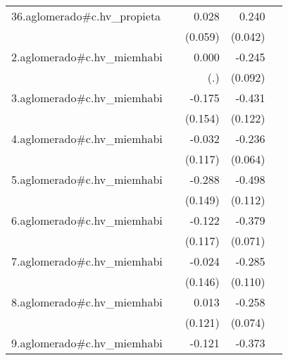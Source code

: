 {\begin{longtable}{l*{4}{D{.}{.}{-1}}}
\addlinespace
36.aglomerado#c.hv\_propieta&                     &       0.028         &       0.240\sym{***}&                     \\
            &                     &     (0.059)         &     (0.042)         &                     \\
\addlinespace
2.aglomerado#c.hv\_miemhabi&                     &       0.000         &      -0.245\sym{**} &                     \\
            &                     &         (.)         &     (0.092)         &                     \\
\addlinespace
3.aglomerado#c.hv\_miemhabi&                     &      -0.175         &      -0.431\sym{***}&                     \\
            &                     &     (0.154)         &     (0.122)         &                     \\
\addlinespace
4.aglomerado#c.hv\_miemhabi&                     &      -0.032         &      -0.236\sym{***}&                     \\
            &                     &     (0.117)         &     (0.064)         &                     \\
\addlinespace
5.aglomerado#c.hv\_miemhabi&                     &      -0.288         &      -0.498\sym{***}&                     \\
            &                     &     (0.149)         &     (0.112)         &                     \\
\addlinespace
6.aglomerado#c.hv\_miemhabi&                     &      -0.122         &      -0.379\sym{***}&                     \\
            &                     &     (0.117)         &     (0.071)         &                     \\
\addlinespace
7.aglomerado#c.hv\_miemhabi&                     &      -0.024         &      -0.285\sym{**} &                     \\
            &                     &     (0.146)         &     (0.110)         &                     \\
\addlinespace
8.aglomerado#c.hv\_miemhabi&                     &       0.013         &      -0.258\sym{***}&                     \\
            &                     &     (0.121)         &     (0.074)         &                     \\
\addlinespace
9.aglomerado#c.hv\_miemhabi&                     &      -0.121         &      -0.373\sym{***}&                     \\

\end{longtable}}

